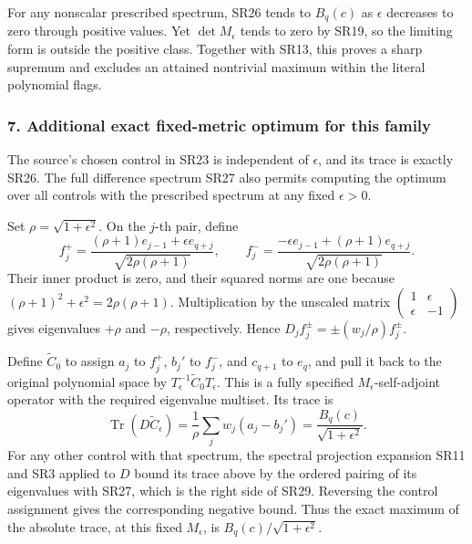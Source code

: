 \documentclass{article}
\begin{document}
For any nonscalar prescribed spectrum, SR26 tends to \(B_q(c)\) as \(\epsilon\) decreases to zero through positive values. Yet \(\det M_\epsilon\) tends to zero by SR19, so the limiting form is outside the positive class. Together with SR13, this proves a sharp supremum and excludes an attained nontrivial maximum within the literal polynomial flags.

\subsubsection{7. Additional exact fixed-metric optimum for this family}\label{endpoint-four_window_sharpness_review--additional-exact-fixed-metric-optimum-for-this-family}

The source's chosen control in SR23 is independent of \(\epsilon\), and its trace is exactly SR26. The full difference spectrum SR27 also permits computing the optimum over all controls with the prescribed spectrum at any fixed \(\epsilon>0\).

Set \(\rho=\sqrt{1+\epsilon^2}\). On the \(j\)-th pair, define \[
f_j^+=\frac{(\rho+1)e_{j-1}+\epsilon e_{q+j}}
{\sqrt{2\rho(\rho+1)}},\qquad
f_j^-=\frac{-\epsilon e_{j-1}+(\rho+1)e_{q+j}}
{\sqrt{2\rho(\rho+1)}}.
\tag{SR28}
\] Their inner product is zero, and their squared norms are one because \((\rho+1)^2+\epsilon^2=2\rho(\rho+1)\). Multiplication by the unscaled matrix \(\begin{pmatrix}1&\epsilon\\\epsilon&-1\end{pmatrix}\) gives eigenvalues \(+\rho\) and \(-\rho\), respectively. Hence \(D_j f_j^\pm=\pm(w_j/\rho)f_j^\pm\).

Define \(\widetilde C_0\) to assign \(a_j\) to \(f_j^+\), \(b_j'\) to \(f_j^-\), and \(c_{q+1}\) to \(e_q\), and pull it back to the original polynomial space by \(T_\epsilon^{-1}\widetilde C_0T_\epsilon\). This is a fully specified \(M_\epsilon\)-self-adjoint operator with the required eigenvalue multiset. Its trace is \[
\operatorname{Tr}(D\widetilde C_\epsilon)
=\frac{1}{\rho}\sum_jw_j(a_j-b_j')
=\frac{B_q(c)}{\sqrt{1+\epsilon^2}}.
\tag{SR29}
\] For any other control with that spectrum, the spectral projection expansion SR11 and SR3 applied to \(D\) bound its trace above by the ordered pairing of its eigenvalues with SR27, which is the right side of SR29. Reversing the control assignment gives the corresponding negative bound. Thus the exact maximum of the absolute trace, at this fixed \(M_\epsilon\), is \(B_q(c)/\sqrt{1+\epsilon^2}\).
\end{document}
